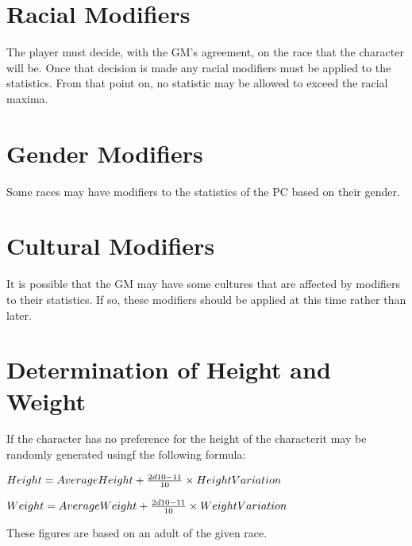 

\clearpage

\section{Racial Modifiers}

The player must decide, with the GM's agreement, on the race that the 
character will be. Once that decision is made any racial modifiers 
must be applied to the statistics. From that point on, no statistic 
may be allowed to exceed the racial maxima.

\section{Gender Modifiers}

Some races may have modifiers to the statistics of the PC based on 
 their gender.

\section{Cultural Modifiers}

It is possible that the GM may have some cultures that are affected 
by modifiers to their statistics. If so, these modifiers should be 
applied at this time rather than later.

\section{Determination of Height and Weight}

If the character has no preference for the height of the characterit 
may be randomly generated usingf the following formula:

\( Height = AverageHeight + {{2d10 - 11} \over {10}} \times 
HeightVariation
\)

\( Weight = AverageWeight + {{2d10 - 11} \over {10}} \times 
WeightVariation
\)

These figures are based on an adult of the given race.
 

